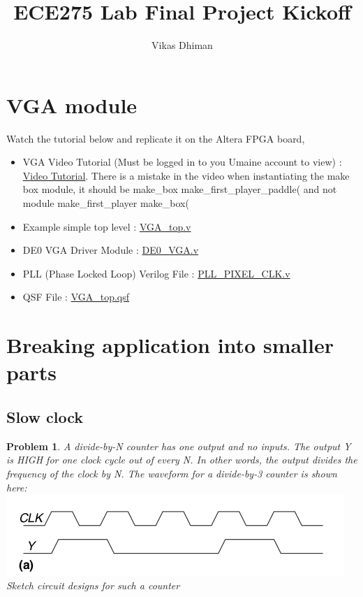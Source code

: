 \documentclass{article}
\newtheorem{prob}{Problem}
\begin{document}
\title{ECE275 Lab Final Project Kickoff}
\author{Vikas Dhiman}
\maketitle

\section{VGA module}

Watch the tutorial below and replicate it on the Altera FPGA board,

\begin{itemize}
\item
  VGA Video Tutorial (Must be logged in to you Umaine account to view) :
  \href{https://drive.google.com/file/d/1KwSqLo8CvzKBAjxMmDpdbc_UMAonZH9S/view?usp=sharing}{Video
  Tutorial}.
  There is a mistake in the video when instantiating the make box
  module, it should be make\_box make\_first\_player\_paddle( and not
  module make\_first\_player make\_box(
\item
  Example simple top level :
  \href{https://vikasdhiman.info/ECE275-Sequential-Logic/lab_pdfs/final_project_vga_files/VGA_top.v}{VGA\_top.v}
\item
  DE0 VGA Driver Module :
  \href{https://vikasdhiman.info/ECE275-Sequential-Logic/lab_pdfs/final_project_vga_files/DE0_VGA.v}{DE0\_VGA.v}
\item
  PLL (Phase Locked Loop) Verilog File :
  \href{https://vikasdhiman.info/ECE275-Sequential-Logic/lab_pdfs/final_project_vga_files/PLL_PIXEL_CLK.v}{PLL\_PIXEL\_CLK.v}
\item
  QSF File :
  \href{https://vikasdhiman.info/ECE275-Sequential-Logic/lab_pdfs/final_project_vga_files/VGA_top.qsf}{VGA\_top.qsf}
\end{itemize}



\section{Breaking application into smaller parts }
\subsection{Slow clock}

\begin{prob}
  A divide-by-N counter has one output and no inputs. The output Y is HIGH for
  one clock cycle out of every N. In other words, the output divides the frequency
  of the clock by N. The waveform for a divide-by-3 counter is shown here:\\
  \includegraphics[width=0.8\linewidth]{./fig/fig.38a-divide-by-3-counter.png}\\
  Sketch circuit designs for such a counter
\end{prob}
\end{document}
